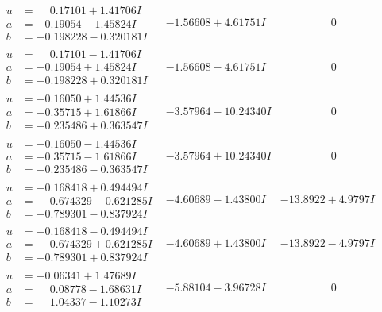\documentclass[1p]{elsarticle_modified}
\theoremstyle{definition}
\begin{document}
$$\begin{array}{c|c|c}
 \hline 
\begin{aligned}
u &= \phantom{-}0.17101 + 1.41706 I \\
a &= -0.19054 - 1.45824 I \\
b &= -0.198228 - 0.320181 I\end{aligned}
 & -1.56608 + 4.61751 I & \phantom{-0.000000 } 0 \\ \hline\begin{aligned}
u &= \phantom{-}0.17101 - 1.41706 I \\
a &= -0.19054 + 1.45824 I \\
b &= -0.198228 + 0.320181 I\end{aligned}
 & -1.56608 - 4.61751 I & \phantom{-0.000000 } 0 \\ \hline\begin{aligned}
u &= -0.16050 + 1.44536 I \\
a &= -0.35715 + 1.61866 I \\
b &= -0.235486 + 0.363547 I\end{aligned}
 & -3.57964 - 10.24340 I & \phantom{-0.000000 } 0 \\ \hline\begin{aligned}
u &= -0.16050 - 1.44536 I \\
a &= -0.35715 - 1.61866 I \\
b &= -0.235486 - 0.363547 I\end{aligned}
 & -3.57964 + 10.24340 I & \phantom{-0.000000 } 0 \\ \hline\begin{aligned}
u &= -0.168418 + 0.494494 I \\
a &= \phantom{-}0.674329 - 0.621285 I \\
b &= -0.789301 - 0.837924 I\end{aligned}
 & -4.60689 - 1.43800 I & -13.8922 + 4.9797 I \\ \hline\begin{aligned}
u &= -0.168418 - 0.494494 I \\
a &= \phantom{-}0.674329 + 0.621285 I \\
b &= -0.789301 + 0.837924 I\end{aligned}
 & -4.60689 + 1.43800 I & -13.8922 - 4.9797 I \\ \hline\begin{aligned}
u &= -0.06341 + 1.47689 I \\
a &= \phantom{-}0.08778 - 1.68631 I \\
b &= \phantom{-}1.04337 - 1.10273 I\end{aligned}
 & -5.88104 - 3.96728 I & \phantom{-0.000000 } 0 \\ \hline\begin{aligned}

\end{aligned}
\end{array}$$
\end{document}
